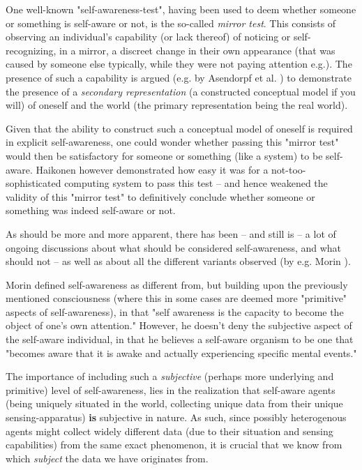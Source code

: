 	One well-known "self-awareness-test", having been used to deem whether someone or something is self-aware or not, is the so-called \textit{mirror test}. This consists of observing an individual's capability (or lack thereof) of noticing or self-recognizing, in a mirror, a discreet change in their own appearance (that was caused by someone else typically, while they were not paying attention e.g.). The presence of such a capability is argued (e.g. by Asendorpf et al. \cite{asendorpf}) to demonstrate the presence of a \textit{secondary representation} (a constructed conceptual model if you will) of oneself and the world (the primary representation being the real world). 

	Given that the ability to construct such a conceptual model of oneself is required in explicit self-awareness, one could wonder whether passing this "mirror test" would then be satisfactory for someone or something (like a system) to be self-aware. Haikonen \cite{haikonen} however demonstrated how easy it was for a not-too-sophisticated computing system to pass this test -- and hence weakened the validity of this "mirror test" to definitively conclude whether someone or something was indeed self-aware or not.

	As should be more and more apparent, there has been -- and still is -- a lot of ongoing discussions about what should be considered self-awareness, and what should not -- as well as about all the different variants observed (by e.g. Morin \cite{morin}).

	Morin defined self-awareness as different from, but building upon the previously mentioned consciousness (where this in some cases are deemed more "primitive" aspects of self-awareness), in that "self awareness is the capacity to become the object of one's own attention." However, he doesn't deny the subjective aspect of the self-aware individual, in that he believes a self-aware organism to be one that "becomes aware that it is awake and actually experiencing specific mental events."

	The importance of including such a \textit{subjective} (perhaps more underlying and primitive) level of self-awareness, lies in the realization that self-aware agents (being uniquely situated in the world, collecting unique data from their unique sensing-apparatus) \textbf{is} subjective in nature. As such, since possibly heterogenous agents might collect widely different data (due to their situation and sensing capabilities) from the same exact phenomenon, it is crucial that we know from which \textit{subject} the data we have originates from.

